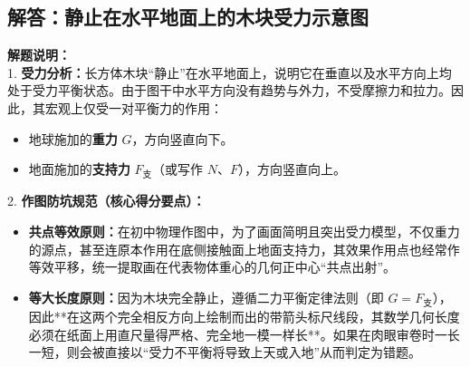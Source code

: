 
\newpage

\subsection{解答：静止在水平地面上的木块受力示意图}

\vspace{0.6cm}

\begin{center}
\end{center}

\vspace{0.6cm}

{\small\color{gray}
\textbf{解题说明：}\\
1. \textbf{受力分析：}长方体木块“静止”在水平地面上，说明它在垂直以及水平方向上均处于受力平衡状态。由于图干中水平方向没有趋势与外力，不受摩擦力和拉力。因此，其宏观上仅受一对平衡力的作用：
\begin{itemize}
    \item 地球施加的\textbf{重力} $G$，方向竖直向下。
    \item 地面施加的\textbf{支持力} $F_{\text{支}}$（或写作 $N$、$F$），方向竖直向上。
\end{itemize}
2. \textbf{作图防坑规范（核心得分要点）：}
\begin{itemize}
    \item \textbf{共点等效原则：}在初中物理作图中，为了画面简明且突出受力模型，不仅重力的源点，甚至连原本作用在底侧接触面上地面支持力，其效果作用点也经常作等效平移，统一提取画在代表物体重心的几何正中心“共点出射”。
    \item \textbf{等大长度原则：}因为木块完全静止，遵循二力平衡定律法则（即 $G = F_{\text{支}}$），因此**在这两个完全相反方向上绘制而出的带箭头标尺线段，其数学几何长度必须在纸面上用直尺量得严格、完全地一模一样长**。如果在肉眼审卷时一长一短，则会被直接以“受力不平衡将导致上天或入地”从而判定为错题。
\end{itemize}
}

